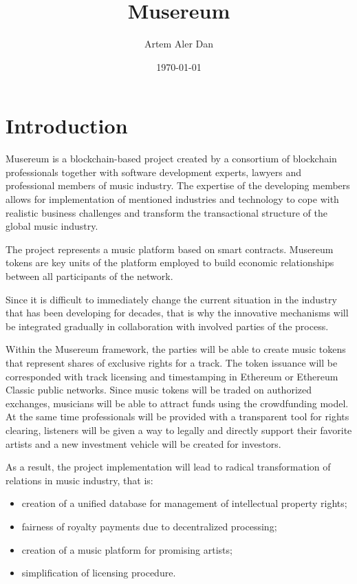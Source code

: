 \documentclass[12pt]{report}
\title{Musereum}
\author{Artem Aler Dan}
\date{\today}
\begin{document}
\maketitle
\pagebreak
\tableofcontents
\pagebreak

\chapter{Introduction}
\label{overview}
Musereum is a blockchain-based project created by a consortium of blockchain professionals together with software development experts, lawyers and professional members of music industry. The expertise of the developing members allows for implementation of mentioned industries and technology to cope with realistic business challenges and transform the transactional structure of the global music industry.

The project represents a music platform based on smart contracts. Musereum tokens are key units of the platform employed to build economic relationships between all participants of the network.

Since it is difficult to immediately change the current situation in the industry that has been developing for decades, that is why the innovative mechanisms will be integrated gradually in collaboration with involved parties of the process.

Within the Musereum framework, the parties will be able to create music tokens that represent shares of exclusive rights for a track. The token issuance will be corresponded with track licensing and timestamping in Ethereum or Ethereum Classic public networks. Since music tokens will be traded on authorized exchanges, musicians will be able to attract funds using the crowdfunding model. At the same time professionals will be provided with a transparent tool for rights clearing, listeners will be given a way to legally and directly support their favorite artists and a new investment vehicle will be created for investors.

As a result, the project implementation will lead to radical transformation of relations in music industry, that is:

\begin{itemize}
	\item  creation of a unified database for management of intellectual property rights;
	\item fairness of royalty payments due to decentralized processing;
	\item creation of a music platform for promising artists;
	\item simplification of licensing procedure.
\end{itemize}
\end{document}
